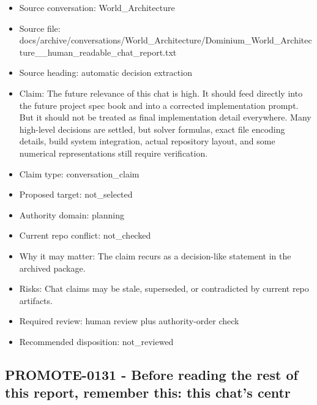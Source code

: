 \documentclass[11pt,a4paper]{report}
\begin{document}
\begin{itemize}
\item Source conversation: World\_Architecture
\item Source file: docs/archive/conversations/World\_Architecture/Dominium\_World\_Architecture\_\_human\_readable\_chat\_report.txt
\item Source heading: automatic decision extraction
\item Claim: The future relevance of this chat is high. It should feed directly into the future project spec book and into a corrected implementation prompt. But it should not be treated as final implementation detail everywhere. Many high-level decisions are settled, but solver formulas, exact file encoding details, build system integration, actual repository layout, and some numerical representations still require verification.
\item Claim type: conversation\_claim
\item Proposed target: not\_selected
\item Authority domain: planning
\item Current repo conflict: not\_checked
\item Why it may matter: The claim recurs as a decision-like statement in the archived package.
\item Risks: Chat claims may be stale, superseded, or contradicted by current repo artifacts.
\item Required review: human review plus authority-order check
\item Recommended disposition: not\_reviewed
\end{itemize}

\subsection{PROMOTE-0131 - Before reading the rest of this report, remember this: this chat's centr}
\end{document}
